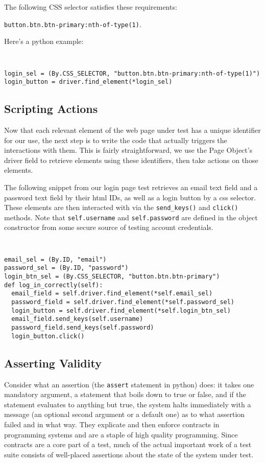 The following CSS selector satisfies these requirements:

\texttt{button.btn.btn-primary:nth-of-type(1)}.

Here's a python example:
{\tt
\begin{verbatim}
login_sel = (By.CSS_SELECTOR, "button.btn.btn-primary:nth-of-type(1)")
login_button = driver.find_element(*login_sel)
\end{verbatim}
} \citep{gupta2003dom,DOMStand78, nicholus2016understanding}


\subsection{Scripting Actions}
Now that each relevant element of the web page under test has a unique identifier for our use, the next step is to write the code that actually triggers the interactions with them. This is fairly straightforward, we use the Page Object's driver field to retrieve elements using these identifiers, then take actions on those elements.

The following snippet from our login page test retrieves an email text field and a password text field by their html IDs, as well as a login button by a css selector. These elements are then interacted with via the \texttt{send\_keys()} and \texttt{click()} methods. Note that \texttt{self.username} and \texttt{self.password} are defined in the object constructor from some secure source of testing account credentials.

{\tt
\begin{verbatim}
email_sel = (By.ID, "email")
password_sel = (By.ID, "password")
login_btn_sel = (By.CSS_SELECTOR, "button.btn.btn-primary")
def log_in_correctly(self):
  email_field = self.driver.find_element(*self.email_sel)
  password_field = self.driver.find_element(*self.password_sel)
  login_button = self.driver.find_element(*self.login_btn_sel)
  email_field.send_keys(self.username)
  password_field.send_keys(self.password)
  login_button.click()
\end{verbatim}
}

\subsection{Asserting Validity}
Consider what an assertion (the \texttt{assert} statement in python) does: it takes one mandatory argument, a statement that boils down to true or false, and if the statement evaluates to anything but true, the system halts immediately with a message (an optional second argument or a default one) as to what assertion failed and in what way. They explicate and then enforce contracts in programming systems and are a staple of high quality programming. Since contracts are a core part of a test, much of the actual important work of a test suite consists of well-placed assertions about the state of the system under test.


